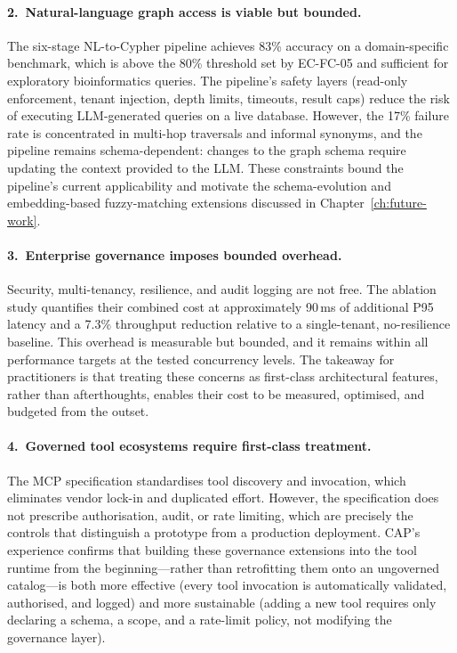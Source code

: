 \documentclass[a4paper,noexaminfo]{sapthesis}
\begin{document}
\paragraph{2.\ Natural-language graph access is viable but bounded.}
The six-stage NL-to-Cypher pipeline achieves 83\% accuracy on a
domain-specific benchmark, which is above the 80\% threshold set by
EC-FC-05 and sufficient for exploratory bioinformatics queries.
The pipeline's safety layers (read-only enforcement, tenant injection,
depth limits, timeouts, result caps) reduce the risk of executing
LLM-generated queries on a live database.  However, the 17\% failure rate
is concentrated in multi-hop traversals and informal synonyms, and the
pipeline remains schema-dependent: changes to the graph schema require
updating the context provided to the LLM.  These constraints bound the
pipeline's current applicability and motivate the schema-evolution and
embedding-based fuzzy-matching extensions discussed in
Chapter~\ref{ch:future-work}.

\paragraph{3.\ Enterprise governance imposes bounded overhead.}
Security, multi-tenancy, resilience, and audit logging are not free.
The ablation study quantifies their combined cost at approximately 90\,ms
of additional P95 latency and a 7.3\% throughput reduction relative to a
single-tenant, no-resilience baseline.  This overhead is measurable but
bounded, and it remains within all performance targets at the tested
concurrency levels.  The takeaway for practitioners is that treating
these concerns as first-class architectural features, rather than
afterthoughts, enables their cost to be measured, optimised, and budgeted
from the outset.

\paragraph{4.\ Governed tool ecosystems require first-class treatment.}
The MCP specification standardises tool discovery and invocation, which
eliminates vendor lock-in and duplicated effort.  However, the
specification does not prescribe authorisation, audit, or rate limiting,
which are precisely the controls that distinguish a prototype from a
production deployment.  CAP's experience confirms that building these
governance extensions into the tool runtime from the beginning---rather
than retrofitting them onto an ungoverned catalog---is both more effective
(every tool invocation is automatically validated, authorised, and logged)
and more sustainable (adding a new tool requires only declaring a schema,
a scope, and a rate-limit policy, not modifying the governance layer).
\end{document}
